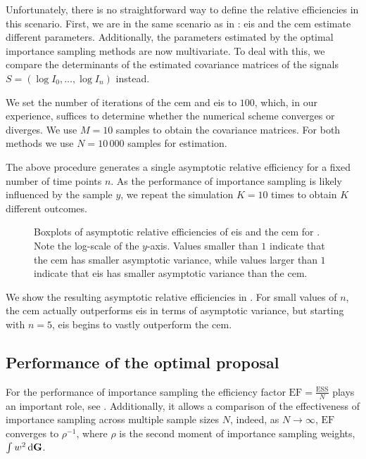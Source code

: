 \begin{example}
    Unfortunately, there is no straightforward way to define the relative efficiencies in this scenario. First, we are in the same scenario as in : \acrshort{eis} and the \acrshort{cem} estimate different parameters. Additionally, the parameters estimated by the optimal importance sampling methods are now multivariate. 
    To deal with this, we compare the determinants of the estimated covariance matrices of the signals $S = \left( \log I_{0}, \dots, \log I_{n} \right)$ instead.

    We set the number of iterations of the \acrshort{cem} and \acrshort{eis} to $100$, which, in our experience, suffices to determine whether the numerical scheme converges or diverges. We use $M=10$ samples to obtain the covariance matrices. For both methods we use $N = 10\,000$ samples for estimation.  

    The above procedure generates a single asymptotic relative efficiency for a fixed number of time points $n$. As the performance of importance sampling is likely influenced by the sample $y$, we repeat the simulation $K=10$ times to obtain $K$ different outcomes. 

    \begin{figure}
        \centering

        \resizebox{\textwidth}{!}{%
        }
        \caption{Boxplots of asymptotic relative efficiencies of \acrshort{eis} and the \acrshort{cem} for . Note the log-scale of the $y$-axis. Values smaller than $1$ indicate that the \acrshort{cem} has smaller asymptotic variance, while values larger than $1$ indicate that \acrshort{eis} has smaller asymptotic variance than the \acrshort{cem}.}
        \label{fig:ssm_comparison_asymptotic_variance}
    \end{figure}

    We show the resulting asymptotic relative efficiencies in . For small values of $n$, the \acrshort{cem} actually outperforms \acrshort{eis} in terms of asymptotic variance, but starting with $n = 5$, \acrshort{eis} begins to vastly outperform the \acrshort{cem}. 
    
\end{example}

%
\subsection{Performance of the optimal proposal}
\label{subsec:performance_at_optimal}
For the performance of importance sampling the efficiency factor $ \text{EF} = \frac{\text{ESS}}{N}$ plays an important role, see . Additionally, it allows a comparison of the effectiveness of importance sampling across multiple sample sizes $N$, indeed, as $N\to\infty$, $\text{EF}$ converges to $ \rho^{-1}$, where $\rho$ is the second moment of importance sampling weights, $\int w^{2} \,\mathrm d \mathbf G$.

